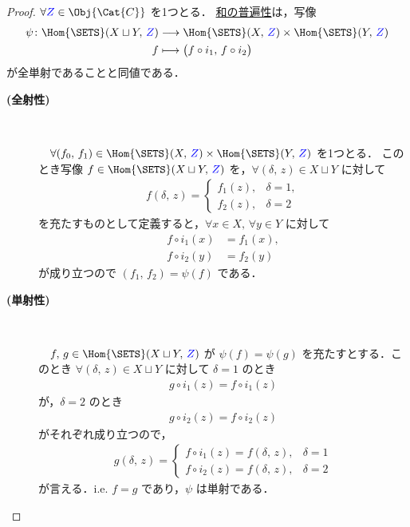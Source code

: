 \documentclass[geometry_main]{subfiles}
\begin{document}
\begin{proof}
	$\forall  \textcolor{blue}{Z} \in \Obj{\Cat{C}}$ を1つとる．
	\hyperref[def:sum]{和の普遍性}は，写像
	\begin{align}
		\psi \colon \Hom{\SETS}(X \sqcup Y,\, \textcolor{blue}{Z}) &\lto \Hom{\SETS}(X,\, \textcolor{blue}{Z}) \times \Hom{\SETS}(Y,\, \textcolor{blue}{Z}) \\
		f &\lmto \bigl( f \circ i_1,\, f \circ i_2 \bigr) \label{eq:univ-sum}
	\end{align}
	が全単射であることと同値である．
	\begin{description}
		\item[\textbf{(全射性)}] 　
		
		　$\forall (f_0,\, f_1) \in \Hom{\SETS}(X,\, \textcolor{blue}{Z}) \times \Hom{\SETS}(Y,\, \textcolor{blue}{Z})$ を1つとる．
		このとき写像 $f \in \Hom{\SETS}(X \sqcup Y,\, \textcolor{blue}{Z})$ を，$\forall (\delta,\, z) \in X \sqcup Y$ に対して
		\begin{align}
			f(\delta,\, z) = 
			\begin{cases}
				f_1(z), &\delta = 1, \\
				f_2(z), &\delta = 2
			\end{cases}
		\end{align}
		を充たすものとして定義すると，$\forall x \in X,\, \forall y \in Y$ に対して
		\begin{align}
			f \circ i_1(x) &= f_1(x),\\ 
			f \circ i_2 (y) &= f_2(y)
		\end{align}
		が成り立つので $(f_1,\, f_2) = \psi(f)$ である．
		\item[\textbf{(単射性)}] 　
		
		　$f,\, g \in \Hom{\SETS}(X \sqcup Y,\, \textcolor{blue}{Z})$ が
		$\psi (f) = \psi(g)$ を充たすとする．このとき $\forall (\delta,\, z) \in X \sqcup Y$ に対して
		$\delta =1$ のとき
		\begin{align}
			g \circ i_1 (z) = f \circ i_1(z)
		\end{align}
		が，$\delta = 2$ のとき
		\begin{align}
			g \circ i_2 (z) = f\circ i_2(z)
		\end{align}
		がそれぞれ成り立つので，
		\begin{align}
			g(\delta,\, z) = 
			\begin{cases}
				f \circ i_1(z) = f(\delta,\, z), &\delta=1 \\
				f \circ i_2(z) = f(\delta,\, z), &\delta=2
			\end{cases}
		\end{align}
		が言える．i.e. $f = g$ であり，$\psi$ は単射である．
	\end{description}
\end{proof}
\end{document}
